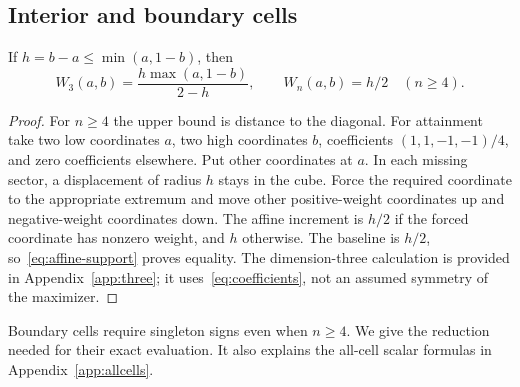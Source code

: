 \subsection{Interior and boundary cells}
\begin{lemma}\label{lem:interior}
If $h=b-a\le\min(a,1-b)$, then
\[
W_3(a,b)=\frac{h\max(a,1-b)}{2-h},\qquad
W_n(a,b)=h/2\quad(n\ge4).
\]
\end{lemma}
\begin{proof}
For $n\ge4$ the upper bound is distance to the diagonal. For attainment take two low coordinates $a$, two high coordinates $b$, coefficients $(1,1,-1,-1)/4$, and zero coefficients elsewhere. Put other coordinates at $a$. In each missing sector, a displacement of radius $h$ stays in the cube. Force the required coordinate to the appropriate extremum and move other positive-weight coordinates up and negative-weight coordinates down. The affine increment is $h/2$ if the forced coordinate has nonzero weight, and $h$ otherwise. The baseline is $h/2$, so~\eqref{eq:affine-support} proves equality. The dimension-three calculation is provided in Appendix~\ref{app:three}; it uses~\eqref{eq:coefficients}, not an assumed symmetry of the maximizer.
\end{proof}

Boundary cells require singleton signs even when $n\ge4$. We give the reduction needed for their exact evaluation. It also explains the all-cell scalar formulas in Appendix~\ref{app:allcells}.


